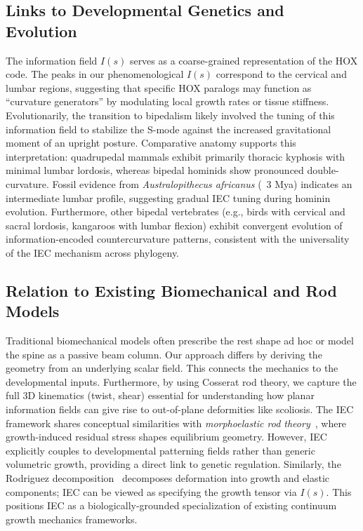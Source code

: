 \documentclass[11pt,a4paper]{article}
\begin{document}
\subsection{Links to Developmental Genetics and Evolution}
The information field $I(s)$ serves as a coarse-grained representation of the HOX code. The peaks in our phenomenological $I(s)$ correspond to the cervical and lumbar regions, suggesting that specific HOX paralogs may function as ``curvature generators'' by modulating local growth rates or tissue stiffness. Evolutionarily, the transition to bipedalism likely involved the tuning of this information field to stabilize the S-mode against the increased gravitational moment of an upright posture. Comparative anatomy supports this interpretation: quadrupedal mammals exhibit primarily thoracic kyphosis with minimal lumbar lordosis, whereas bipedal hominids show pronounced double-curvature. Fossil evidence from \textit{Australopithecus africanus} (~3 Mya) indicates an intermediate lumbar profile, suggesting gradual IEC tuning during hominin evolution. Furthermore, other bipedal vertebrates (e.g., birds with cervical and sacral lordosis, kangaroos with lumbar flexion) exhibit convergent evolution of information-encoded countercurvature patterns, consistent with the universality of the IEC mechanism across phylogeny.

\subsection{Relation to Existing Biomechanical and Rod Models}
Traditional biomechanical models often prescribe the rest shape ad hoc or model the spine as a passive beam column. Our approach differs by deriving the geometry from an underlying scalar field. This connects the mechanics to the developmental inputs. Furthermore, by using Cosserat rod theory, we capture the full 3D kinematics (twist, shear) essential for understanding how planar information fields can give rise to out-of-plane deformities like scoliosis. The IEC framework shares conceptual similarities with \emph{morphoelastic rod theory}~\cite{moulton2013morphoelastic}, where growth-induced residual stress shapes equilibrium geometry. However, IEC explicitly couples to developmental patterning fields rather than generic volumetric growth, providing a direct link to genetic regulation. Similarly, the Rodriguez decomposition~\cite{rodriguez1994stress} decomposes deformation into growth and elastic components; IEC can be viewed as specifying the growth tensor via $I(s)$. This positions IEC as a biologically-grounded specialization of existing continuum growth mechanics frameworks.
\end{document}
